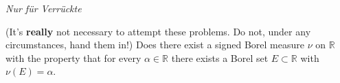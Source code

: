 \documentclass{qlnotes-export}
\begin{document}
\emph{Nur für Verrückte}

(It's \textbf{really} not necessary to attempt these problems. Do not, under any circumstances, hand them in!) Does there exist a signed Borel measure \(\nu\) on \(\mathbb{R}\) with the property that for every \(\alpha \in {\mathbb{R}}\) there exists a Borel set \(E \subset {\mathbb{R}}\) with \(\nu(E) = \alpha\).
\end{document}
